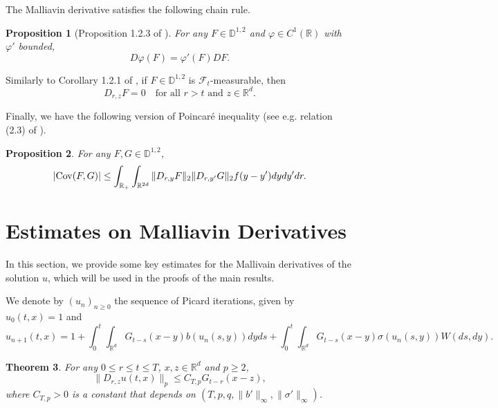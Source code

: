 \documentclass[12pt]{article}
\newtheorem{theorem}{Theorem}[section]
\newtheorem{proposition}[theorem]{Proposition}
\def\cF{\mathcal{F}}
\def\bD{\mathbb{D}}
\def\bR{\mathbb{R}}
\def\s{\sigma}
\begin{document}
The Malliavin derivative satisfies the following chain rule.

\begin{proposition}[Proposition 1.2.3 of \cite{nualart06}] 
For any $F \in \bD^{1,2}$ and $\varphi \in C^1(\bR)$ with $\varphi'$ bounded,
\begin{equation}
\label{chain}
D\varphi(F)=\varphi'(F)DF.
\end{equation}
\end{proposition}

Similarly to Corollary 1.2.1 of \cite{nualart06}, if $F\in \bD^{1,2}$ is $\cF_t$-measurable, then 
\begin{equation}
\label{Mal-zero}
D_{r,z}F=0 \quad \mbox{for all $r>t$ and $z \in \bR^d$}.
\end{equation}

Finally, we have the following version of Poincar\'e inequality (see e.g. relation (2.3) of \cite{NZ22}).

\begin{proposition}
For any $F,G \in \bD^{1,2}$,
\begin{equation}
\label{Poincare}
|{\rm Cov}(F,G)| \leq \int_{\bR_+} \int_{\bR^{2d}} \|D_{r,y}F \|_2 \|D_{r,y'}G\|_2 f(y-y') dydy'dr.
\end{equation}
\end{proposition}


\section{Estimates on Malliavin Derivatives}

In this section, we provide some key estimates for the Mallivain derivatives of the solution $u$, which will be used in the proofs of the main results.

We denote by $(u_n)_{n\geq 0}$ the sequence of Picard iterations, given by $u_0(t,x)=1$ and
\begin{equation}
\label{def-Picard}
u_{n+1}(t,x)=1+\int_0^t \int_{\bR^d}G_{t-s}(x-y)b(u_n(s,y))dyds+\int_0^t \int_{\bR^d}G_{t-s}(x-y)\s(u_n(s,y))W(ds,dy).
\end{equation}


\begin{theorem}
\label{key-Du}
For any $0\leq r\leq t \leq T$, $x,z \in \bR^d$ and $p\geq 2$,
\[
\|D_{r,z}u(t,x)\|_p \leq C_{T,p} G_{t-r}(x-z),
\]
where $C_{T,p}>0$ is a constant that depends on $(T,p,q,\|b'\|_\infty,\|\sigma'\|_\infty)$.
\end{theorem}
\end{document}
